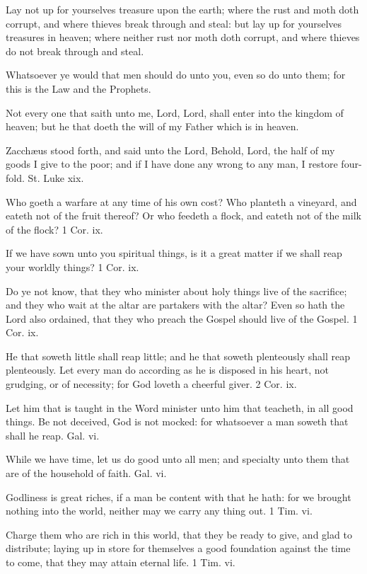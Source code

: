Lay not up for yourselves treasure upon the earth; where the rust and moth doth corrupt, and where thieves break through and steal: but lay up for yourselves treasures in heaven; where neither rust nor moth doth corrupt, and where thieves do not break through and steal.

Whatsoever ye would that men should do unto you, even so do unto them; for this is the Law and the Prophets.

Not every one that saith unto me, Lord, Lord, shall enter into the kingdom of heaven; but he that doeth the will of my Father which is in heaven.


Zacchæus stood forth, and said unto the Lord, Behold, Lord, the half of my goods I give to the poor; and if I have done any wrong to any man, I restore four-fold. St. Luke xix.

Who goeth a warfare at any time of his own cost? Who planteth a vineyard, and eateth not of the fruit thereof? Or who feedeth a flock, and eateth not of the milk of the flock? 1 Cor. ix.

If we have sown unto you spiritual things, is it a great matter if we shall reap your worldly things? 1 Cor. ix.

Do ye not know, that they who minister about holy things live of the sacrifice; and they who wait at the altar are partakers with the altar? Even so hath the Lord also ordained, that they who preach the Gospel should live of the Gospel. 1 Cor. ix.

He that soweth little shall reap little; and he that soweth plenteously shall reap plenteously. Let every man do according as he is disposed in his heart, not grudging, or of necessity; for God loveth a cheerful giver. 2 Cor. ix.

Let him that is taught in the Word minister unto him that teacheth, in all good things. Be not deceived, God is not mocked: for whatsoever a man soweth that shall he reap. Gal. vi.

While we have time, let us do good unto all men; and specialty unto them that are of the household of faith. Gal. vi.

Godliness is great riches, if a man be content with that he hath: for we brought nothing into the world, neither may we carry any thing out. 1 Tim. vi.

Charge them who are rich in this world, that they be ready to give, and glad to distribute; laying up in store for themselves a good foundation against the time to come, that they may attain eternal life. 1 Tim. vi.

